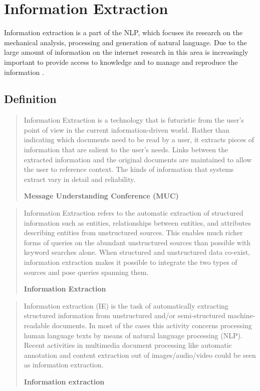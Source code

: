 \section{Information Extraction}
\label{sec:information-extraction}

Information extraction is a part of the \gls{NLP}, which focuses its research on the mechanical analysis, processing and generation of natural language. Due to the large amount of information on the internet research in this area is increasingly important to provide access to knowledge and to manage and reproduce the information \cite{Weinhofer:2010}\cite{Linsmayr:2010}.

\subsection{Definition}

\begin{quote}
Information Extraction is a technology that is futuristic from the user's point of view in the current information-driven world. Rather than indicating which documents need to be read by a user, it extracts pieces of information that are salient to the user's needs. Links between the extracted information and the original documents are maintained to allow the user to reference context. The kinds of information that systems extract vary in detail and reliability.

\hfill \textbf{Message Understanding Conference (MUC)}

\hfill \citeauthor{Chinchor:2001} \cite{Chinchor:2001}
\end{quote}

\begin{quote}
Information Extraction refers to the automatic extraction of structured information such as entities, relationships between entities, and attributes describing entities from unstructured sources. This enables much richer forms of queries on the abundant unstructured sources than possible with keyword searches alone. When structured and unstructured data co-exist, information extraction makes it possible to integrate the two types of sources and pose queries spanning them.

\hfill \textbf{Information Extraction}

\hfill \citeauthor{Sarawagi:2008} \cite{Sarawagi:2008}
\end{quote}

\begin{quote}
Information extraction (IE) is the task of automatically extracting structured information from unstructured and/or semi-structured machine-readable documents. In most of the cases this activity concerns processing human language texts by means of natural language processing (NLP). Recent activities in multimedia document processing like automatic annotation and content extraction out of images/audio/video could be seen as information extraction.

\hfill \textbf{Information extraction}

\hfill \citeauthor{Wikipedia:IE:2012} \cite{Wikipedia:IE:2012}
\end{quote}


